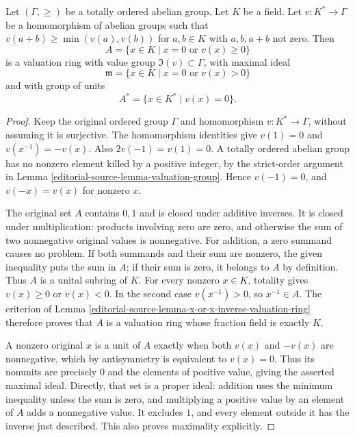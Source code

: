 \begin{lemma}
\label{editorial-source-lemma-valuation-valuation-ring}
Let $(\Gamma, \geq)$ be a totally ordered abelian group.
Let $K$ be a field. Let $v : K^* \to \Gamma$ be a homomorphism
of abelian groups such that $v(a + b) \geq \min(v(a), v(b))$ for
$a, b \in K$ with $a, b, a + b$ not zero. Then
$$
A =
\{
x \in K \mid x = 0 \text{ or } v(x) \geq 0
\}
$$
is a valuation ring with value group $\Im(v) \subset \Gamma$,
with maximal ideal
$$
\mathfrak m =
\{
x \in K \mid x = 0 \text{ or } v(x) > 0
\}
$$
and with group of units
$$
A^* =
\{
x \in K^* \mid v(x) = 0
\}.
$$
\end{lemma}

\begin{proof}
Keep the original ordered group
$\Gamma$ and homomorphism
$v:K^*\to\Gamma$, without
assuming it is surjective.
The homomorphism identities give
$v(1)=0$ and $v(x^{-1})=-v(x)$.
Also $2v(-1)=v(1)=0$.
A totally ordered abelian group
has no nonzero element killed
by a positive integer, by
the strict-order argument in
Lemma \ref{editorial-source-lemma-valuation-group}.
Hence $v(-1)=0$, and
$v(-x)=v(x)$ for nonzero $x$.

The original set $A$ contains
$0,1$ and is closed under
additive inverses. It is
closed under multiplication:
products involving zero are
zero, and otherwise the
sum of two nonnegative
original values is nonnegative.
For addition, a zero summand
causes no problem. If both
summands and their sum are
nonzero, the given inequality
puts the sum in $A$;
if their sum is zero,
it belongs to $A$ by
definition. Thus $A$ is
a unital subring of $K$.
For every nonzero $x\in K$,
totality gives $v(x)\geq0$
or $v(x)<0$. In the
second case $v(x^{-1})>0$,
so $x^{-1}\in A$.
The criterion of Lemma
\ref{editorial-source-lemma-x-or-x-inverse-valuation-ring}
therefore proves that $A$
is a valuation ring whose
fraction field is exactly $K$.

A nonzero original $x$
is a unit of $A$ exactly
when both $v(x)$ and
$-v(x)$ are nonnegative,
which by antisymmetry is
equivalent to $v(x)=0$.
Thus its nonunits are
precisely $0$ and the
elements of positive value,
giving the asserted maximal
ideal. Directly, that set
is a proper ideal: addition
uses the minimum inequality
unless the sum is zero,
and multiplying a positive
value by an element of
$A$ adds a nonnegative
value. It excludes $1$,
and every element outside
it has the inverse just
described. This also proves
maximality explicitly.


\end{proof}
